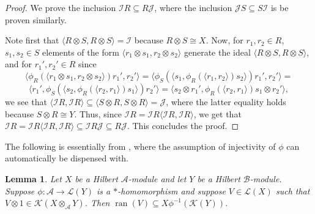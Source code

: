 \documentclass[11pt, letterpaper,final]{amsart}
\newcommand{\A}{{\mathcal{A}}}
\newcommand{\B}{{\mathcal{B}}}
\newcommand{\I}{{\mathcal{I}}}
\newcommand{\J}{{\mathcal{J}}}
\newcommand{\K}{{\mathcal{K}}}
\renewcommand{\L}{{\mathcal{L}}}
\newcommand{\ran}{\operatorname{ran}}
\newtheorem{lem}[thm]{Lemma}
\theoremstyle{definition}
\begin{document}
\begin{proof}
We prove the inclusion $\I R \subseteq R\J$, where the inclusion $\J S \subseteq S \I$ is be proven similarly.

Note first that $\langle R \otimes S, R\otimes S \rangle = \I$ because $R\otimes S \cong X$. Now, for $r_1,r_2 \in R$, $s_1,s_2 \in S$ elements of the form $\langle r_1 \otimes s_1 , r_2 \otimes s_2 \rangle$ generate the ideal $\langle R \otimes S, R\otimes S \rangle$, and for $r_1',r_2' \in R$ since
$$
\langle \phi_R(\langle r_1 \otimes s_1 , r_2 \otimes s_2 \rangle) r_1',r_2' \rangle = \langle \phi_S(\langle s_1, \phi_R(\langle r_1,r_2 \rangle) s_2 \rangle) r_1',r_2' \rangle = 
$$
$$
\langle r_1', \phi_S(\langle s_2, \phi_R(\langle r_2,r_1 \rangle) s_1 \rangle) r_2' \rangle = \langle s_2 \otimes r_1', \phi_R(\langle r_2,r_1 \rangle) s_1 \otimes r_2' \rangle,
$$
we see that $\langle \I R, \I R \rangle \subseteq \langle S \otimes R, S \otimes R \rangle = \J$, where the latter equality holds because $S\otimes R \cong Y$. Thus, since $\I R = \I R \langle \I R, \I R \rangle$, we get that $\I R = \I R \langle \I R, \I R \rangle \subseteq \I R \J \subseteq R \J$. This concludes the proof.
\end{proof}

The following is essentially from \cite[Lemma~4.2]{FMR-IUMJ2003}, where the assumption of injectivity of $\phi$ can automatically be dispensed with.

\begin{lem}\label{lem:gen-fmr}
Let $X$ be a Hilbert $\A$-module and let $Y$ be a Hilbert $\B$-module.  Suppose $\phi \colon \A \to \L(Y)$ is a $*$-homomorphism and suppose $V \in \L(X)$ such that $V \otimes 1 \in \K( X \otimes_{\A} Y)$.  Then $\ran(V) \subseteq X\phi^{-1}(\K(Y))$.
\end{lem}
\end{document}
